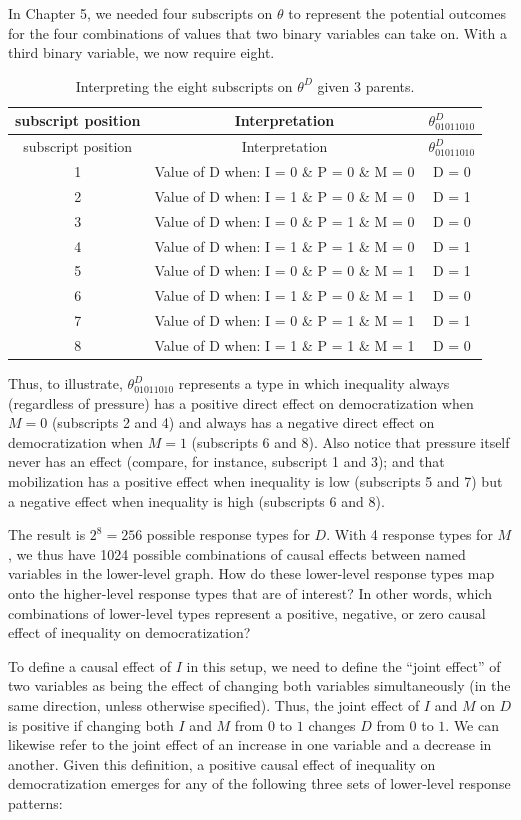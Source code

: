 \documentclass[
  12pt,
]{book}
\begin{document}
In Chapter 5, we needed four subscripts on \(\theta\) to represent the potential outcomes for the four combinations of values that two binary variables can take on. With a third binary variable, we now require eight.

\begin{longtable}[]{@{}ccc@{}}
\caption{\label{tab:interpretation} Interpreting the eight subscripts on \(\theta^D\) given 3 parents.}\tabularnewline
\toprule
subscript position & Interpretation & \(\theta^D_{01011010}\)\tabularnewline
\midrule
\endfirsthead
\toprule
subscript position & Interpretation & \(\theta^D_{01011010}\)\tabularnewline
\midrule
\endhead
1 & Value of D when: I = 0 \& P = 0 \& M = 0 & D = 0\tabularnewline
2 & Value of D when: I = 1 \& P = 0 \& M = 0 & D = 1\tabularnewline
3 & Value of D when: I = 0 \& P = 1 \& M = 0 & D = 0\tabularnewline
4 & Value of D when: I = 1 \& P = 1 \& M = 0 & D = 1\tabularnewline
5 & Value of D when: I = 0 \& P = 0 \& M = 1 & D = 1\tabularnewline
6 & Value of D when: I = 1 \& P = 0 \& M = 1 & D = 0\tabularnewline
7 & Value of D when: I = 0 \& P = 1 \& M = 1 & D = 1\tabularnewline
8 & Value of D when: I = 1 \& P = 1 \& M = 1 & D = 0\tabularnewline
\bottomrule
\end{longtable}

Thus, to illustrate, \(\theta^D_{01011010}\) represents a type in which inequality always (regardless of pressure) has a positive direct effect on democratization when \(M=0\) (subscripts 2 and 4) and always has a negative direct effect on democratization when \(M=1\) (subscripts 6 and 8). Also notice that pressure itself never has an effect (compare, for instance, subscript 1 and 3); and that mobilization has a positive effect when inequality is low (subscripts 5 and 7) but a negative effect when inequality is high (subscripts 6 and 8).

The result is \(2^8=256\) possible response types for \(D\). With 4 response types for \(M\), we thus have 1024 possible combinations of causal effects between named variables in the lower-level graph. How do these lower-level response types map onto the higher-level response types that are of interest? In other words, which combinations of lower-level types represent a positive, negative, or zero causal effect of inequality on democratization?

To define a causal effect of \(I\) in this setup, we need to define the ``joint effect'' of two variables as being the effect of changing both variables simultaneously (in the same direction, unless otherwise specified). Thus, the joint effect of \(I\) and \(M\) on \(D\) is positive if changing both \(I\) and \(M\) from \(0\) to \(1\) changes \(D\) from \(0\) to \(1\). We can likewise refer to the joint effect of an increase in one variable and a decrease in another. Given this definition, a positive causal effect of inequality on democratization emerges for any of the following three sets of lower-level response patterns:
\end{document}
